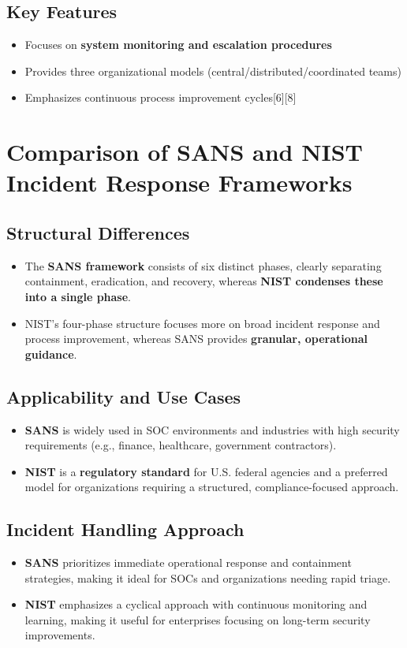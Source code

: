 \documentclass[11pt]{book}
\begin{document}
\section{Key Features}
\begin{itemize}
    \item Focuses on \textbf{system monitoring and escalation procedures}
    \item Provides three organizational models (central/distributed/coordinated teams)
    \item Emphasizes continuous process improvement cycles[6][8]
\end{itemize}


\chapter{Comparison of SANS and NIST Incident Response Frameworks}

\section{Structural Differences}
\begin{itemize}
    \item The \textbf{SANS framework} consists of six distinct phases, clearly separating containment, eradication, and recovery, whereas \textbf{NIST condenses these into a single phase}.
    \item NIST’s four-phase structure focuses more on broad incident response and process improvement, whereas SANS provides \textbf{granular, operational guidance}.
\end{itemize}

\section{Applicability and Use Cases}
\begin{itemize}
    \item \textbf{SANS} is widely used in SOC environments and industries with high security requirements (e.g., finance, healthcare, government contractors).
    \item \textbf{NIST} is a \textbf{regulatory standard} for U.S. federal agencies and a preferred model for organizations requiring a structured, compliance-focused approach.
\end{itemize}

\section{Incident Handling Approach}
\begin{itemize}
    \item \textbf{SANS} prioritizes immediate operational response and containment strategies, making it ideal for SOCs and organizations needing rapid triage.
    \item \textbf{NIST} emphasizes a cyclical approach with continuous monitoring and learning, making it useful for enterprises focusing on long-term security improvements.
\end{itemize}
\end{document}
